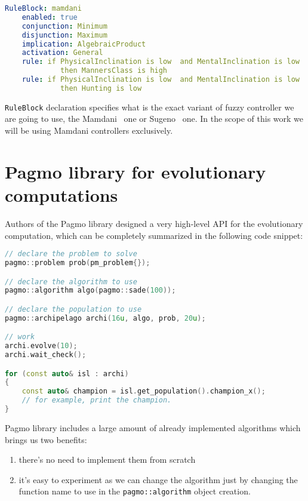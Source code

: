 \documentclass[12pt, a4paper]{report}
\begin{document}
  \begin{lstlisting}[language=yaml]
  RuleBlock: mamdani
    enabled: true
    conjunction: Minimum
    disjunction: Maximum
    implication: AlgebraicProduct
    activation: General
    rule: if PhysicalInclination is low  and MentalInclination is low
    	     then MannersClass is high
    rule: if PhysicalInclination is low  and MentalInclination is low 
    	     then Hunting is low
  \end{lstlisting}

	
  \texttt{RuleBlock} declaration specifies what is the exact variant of fuzzy controller we are going to use, the Mamdani~\cite{fuzzy::Mamdani} one or Sugeno~\cite{fuzzy::Sugeno} one.
  In the scope of this work we will be using Mamdani controllers exclusively.

	\section{Pagmo library for evolutionary computations}

	Authors of the Pagmo library designed a very high-level API for the evolutionary computation, which can be completely summarized in the following code snippet:
	
	\begin{lstlisting}[language=c++]
// declare the problem to solve
pagmo::problem prob(pm_problem{});

// declare the algorithm to use
pagmo::algorithm algo(pagmo::sade(100));

// declare the population to use
pagmo::archipelago archi(16u, algo, prob, 20u);

// work
archi.evolve(10);
archi.wait_check();

for (const auto& isl : archi)
{
	const auto& champion = isl.get_population().champion_x();
	// for example, print the champion.
}
	\end{lstlisting}

	Pagmo library includes a large amount of already implemented algorithms which brings us two benefits:
	
	\begin{enumerate}
		\item there's no need to implement them from scratch
		\item it's easy to experiment as we can change the algorithm just by changing the function name to use in the \texttt{pagmo::algorithm} object creation.
	\end{enumerate}
	
\end{document}

